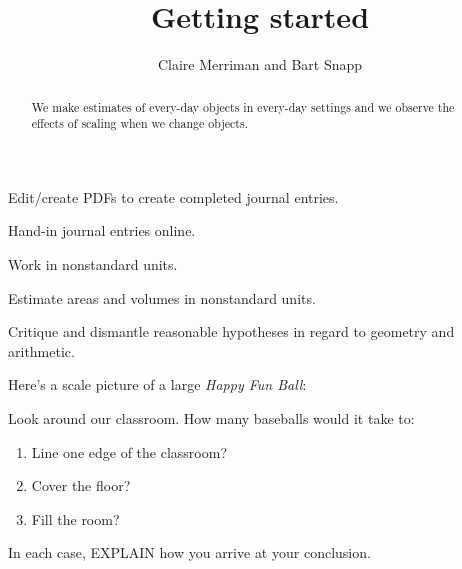 \documentclass[handout,noauthor,nooutcomes,hints,12pt]{ximera}
\title{Getting started}
\author{Claire Merriman and Bart Snapp}
\begin{document}
\begin{abstract}
  We make estimates of every-day objects in every-day settings and we
  observe the effects of scaling when we change objects.
\end{abstract}
\maketitle



\begin{listOutcomes}
\item{Edit/create PDFs to create completed journal entries.}
\item{Hand-in journal entries online.}
\item{Work in nonstandard units.}
\item{Estimate areas and volumes in nonstandard units.}
\item{Critique and dismantle reasonable hypotheses in regard to geometry and arithmetic.}
\end{listOutcomes}

\mynewpage


\begin{question}
  Here's a scale picture of a large \textit{Happy Fun Ball}:
  \begin{center}
  \end{center}
Look around our classroom. How many baseballs would it take to:
\begin{enumerate}
\item Line one edge of the classroom?
 \item Cover the floor?
 \item Fill the room?
\end{enumerate}
In each case, EXPLAIN how you arrive at your conclusion.
\end{question}
\mynewpage
\end{document}
